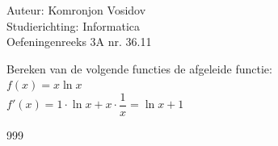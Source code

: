 \documentclass[a4paper]{article}
\begin{document}
	
	\noindent \large Auteur: Komronjon Vosidov \\
	\noindent \large Studierichting: Informatica\\
	\noindent \large Oefeningenreeks 3A nr. 36.11\\
	
	\medskip
	
	\normalsize
	Bereken van de volgende functies de afgeleide functie:\\
	
	$f(x) = x \ln x$\\
	
	$f'(x) = 1 \cdot \ln x + x \cdot \dfrac{1}{x} = \ln x + 1$ \\
	
	

	
	
\begin{thebibliography}{999}
\end{thebibliography}	
\end{document}
